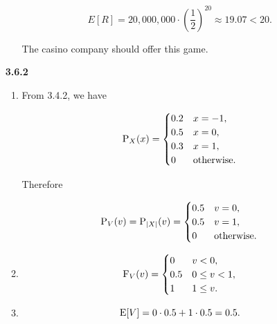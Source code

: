 \documentclass{article}
\begin{document}
\begin{enumerate}
\begin{enumerate}[label=(\alph*)]
        $$E[R] = 20,000,000 \cdot (\frac{1}{2})^{20} \approx 19.07 < 20.$$

        The casino company should offer this game.


    \end{enumerate}

    \item [\textbf{3.6.2}]

    \begin{enumerate}[label=(\alph*)]
        \item 
        
        From 3.4.2, we have

        $$
        \text P_X(x) =
        \begin{cases}
            0.2 & x = -1, \\
            0.5 & x = 0, \\
            0.3 & x = 1, \\
            0   & \text{otherwise}.
        \end{cases}
        $$

        Therefore

        $$
        \text P_V(v) = \text P_{|X|}(v) =
        \begin{cases}
            0.5 & v = 0, \\
            0.5 & v = 1, \\
            0   & \text{otherwise}.
        \end{cases}
        $$

        \item 
        $$
        \text F_V(v) =
        \begin{cases}
            0   & v < 0, \\
            0.5 & 0 \le v < 1, \\
            1   & 1 \le v.  \\
        \end{cases}
        $$

        \item
        $$
        \text E[V] = 0 \cdot 0.5 + 1 \cdot 0.5 = 0.5.
        $$

    \end{enumerate}


\end{enumerate}
\end{document}
